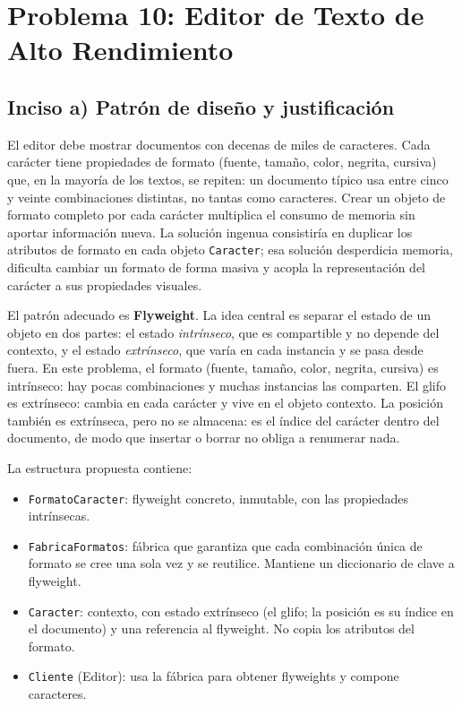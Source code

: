 \section{Problema 10: Editor de Texto de Alto Rendimiento}

\subsection{Inciso a) Patrón de diseño y justificación}

El editor debe mostrar documentos con decenas de miles de caracteres. Cada carácter tiene propiedades de formato (fuente, tamaño, color, negrita, cursiva) que, en la mayoría de los textos, se repiten: un documento típico usa entre cinco y veinte combinaciones distintas, no tantas como caracteres. Crear un objeto de formato completo por cada carácter multiplica el consumo de memoria sin aportar información nueva. La solución ingenua consistiría en duplicar los atributos de formato en cada objeto \texttt{Caracter}; esa solución desperdicia memoria, dificulta cambiar un formato de forma masiva y acopla la representación del carácter a sus propiedades visuales.

El patrón adecuado es \textbf{Flyweight}. La idea central es separar el estado de un objeto en dos partes: el estado \emph{intrínseco}, que es compartible y no depende del contexto, y el estado \emph{extrínseco}, que varía en cada instancia y se pasa desde fuera. En este problema, el formato (fuente, tamaño, color, negrita, cursiva) es intrínseco: hay pocas combinaciones y muchas instancias las comparten. El glifo es extrínseco: cambia en cada carácter y vive en el objeto contexto. La posición también es extrínseca, pero no se almacena: es el índice del carácter dentro del documento, de modo que insertar o borrar no obliga a renumerar nada.

La estructura propuesta contiene:

\begin{itemize}
  \item \texttt{FormatoCaracter}: flyweight concreto, inmutable, con las propiedades intrínsecas.
  \item \texttt{FabricaFormatos}: fábrica que garantiza que cada combinación única de formato se cree una sola vez y se reutilice. Mantiene un diccionario de clave a flyweight.
  \item \texttt{Caracter}: contexto, con estado extrínseco (el glifo; la posición es su índice en el documento) y una referencia al flyweight. No copia los atributos del formato.
  \item \texttt{Cliente} (Editor): usa la fábrica para obtener flyweights y compone caracteres.
\end{itemize}


